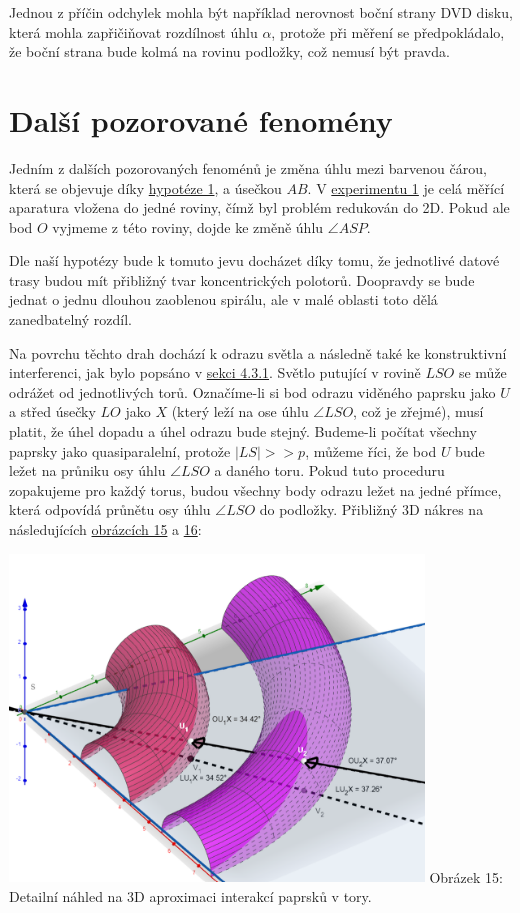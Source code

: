 \documentclass[titlepage]{article}
\begin{document}
Jednou z příčin odchylek mohla být například nerovnost boční strany DVD disku, která mohla zapřičiňovat rozdílnost úhlu $\alpha$, protože při měření se předpokládalo, že boční strana bude kolmá na rovinu podložky, což nemusí být pravda.

 \label{sec:other_fen}
\section{Další pozorované fenomény}

Jedním z dalších pozorovaných fenoménů je změna úhlu mezi barvenou čárou, která se objevuje díky \hyperref[hyp:1]{hypotéze 1}, a úsečkou $AB$.
V \hyperref[exp:1]{experimentu 1} je celá měřící aparatura vložena do jedné roviny, čímž byl problém redukován do 2D.
Pokud ale bod $O$ vyjmeme z této roviny, dojde ke změně úhlu $\angle ASP$.

Dle naší hypotézy bude k tomuto jevu docházet díky tomu, že jednotlivé datové trasy budou mít přibližný tvar koncentrických polotorů.
Doopravdy se bude jednat o jednu dlouhou zaoblenou spirálu, ale v malé oblasti toto dělá zanedbatelný rozdíl.

Na povrchu těchto drah dochází k odrazu světla a následně také ke konstruktivní interferenci, jak bylo popsáno v \hyperref[subsubsec:4.3.1]{sekci 4.3.1}. Světlo putující v rovině $LSO$ se může odrážet od jednotlivých torů. Označíme-li si bod odrazu viděného paprsku jako $U$ a střed úsečky $LO$ jako $X$ (který leží na ose úhlu $\angle LSO$, což je zřejmé), musí platit, že úhel dopadu a úhel odrazu bude stejný.
Budeme-li počítat všechny paprsky jako quasiparalelní, protože $|LS| >> p$, můžeme říci, že bod $U$ bude ležet na průniku osy úhlu $\angle LSO$ a daného toru.
Pokud tuto proceduru zopakujeme pro každý torus, budou všechny body odrazu ležet na jedné přímce, která odpovídá průnětu osy úhlu $\angle LSO$ do podložky. Přibližný 3D nákres na následujících \hyperref[image:15]{obrázcích 15} a \hyperref[image:16]{16}:

 \label{image:15}
\begin{center}
    \includegraphics[width = 11cm]{3D_1.png}
    \linebreak
    Obrázek 15: Detailní náhled na 3D aproximaci interakcí paprsků v tory.
\end{center}
\end{document}
